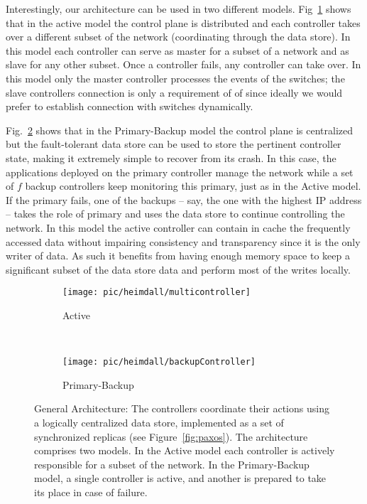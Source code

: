 Interestingly, our architecture can be used in two different models.  Fig~\ref{fig:heimdall:active} shows that in the active model the  control plane is distributed and each controller takes over a different subset of the network (coordinating through the data store). In this model each controller can serve as master for a subset of a network and as slave for any other subset. 
Once a controller fails, any controller can take over.  
In this model only the master controller processes the events of the switches; the slave controllers connection is only a requirement of \gls{of} since ideally we would prefer to establish connection with switches dynamically. 

Fig.~\ref{fig:heimdall:primary-backup} shows that in the Primary-Backup model  the control plane is centralized but the fault-tolerant data store can be used to store the pertinent controller state, making it extremely simple to recover from its crash.
In this case, the applications deployed on the primary controller manage the network while a set of $f$ backup controllers keep monitoring this primary, just as in the Active model.
If the primary fails, one of the backups -- say, the one with the highest IP address -- takes the role of primary and uses the data store to continue controlling the network.
In this model the active controller can contain in cache the frequently accessed data without impairing consistency and transparency since it is the only writer of data. As such it benefits from having enough memory space to keep a significant subset of the data store data and perform most of the writes locally. 

\begin{figure}
  \centering
  \begin{subfigure}[b]{0.545\textwidth}
                \centering
                \texttt{[image: pic/heimdall/multicontroller]}
                \caption{Active}
                \label{fig:heimdall:active}
        \end{subfigure}%
        ~
        \begin{subfigure}[b]{0.465\textwidth}
                \centering
                \texttt{[image: pic/heimdall/backupController]}
                \caption{Primary-Backup}
                \label{fig:heimdall:primary-backup}
        \end{subfigure}
        \caption[General Architecture.]{General Architecture: The controllers coordinate their actions using a logically centralized data store, implemented as a set of synchronized replicas (see Figure~\ref{fig:paxos}). The architecture comprises two models. In the Active model each controller is actively responsible for a subset of the network. In the Primary-Backup model, a single controller is active, and another is prepared to take its place in case of failure.}
        \label{fig:architecture} 
\end{figure}


